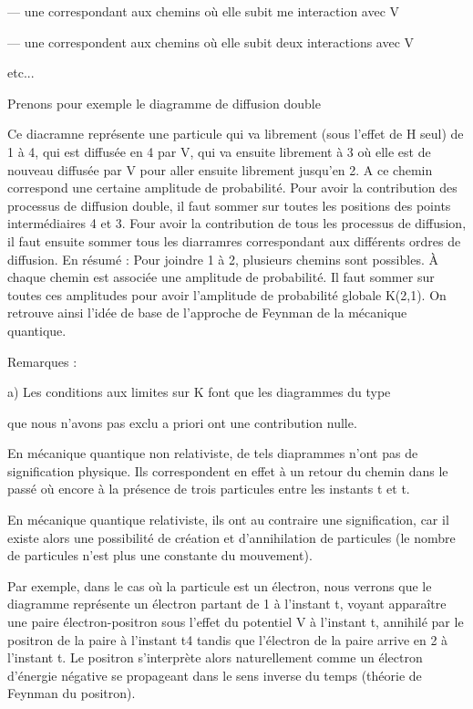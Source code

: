 — une correspondant aux chemins où elle subit me interaction avec V

— une correspondent aux chemins où elle subit deux interactions avec V

etc...

Prenons pour exemple le diagramme de diffusion double

Ce diacramne représente une particule qui va librement (sous l'effet de
H seul) de 1 à 4, qui est diffusée en 4 par V, qui va ensuite librement
à 3 où elle est de nouveau diffusée par V pour aller ensuite librement
jusqu'en 2. A ce chemin correspond une certaine amplitude de probabilité.
Pour avoir la contribution des processus de diffusion double, il faut
sommer sur toutes les positions des points intermédiaires 4 et 3. Four
avoir la contribution de tous les processus de diffusion, il faut ensuite
sommer tous les diarramres correspondant aux différents ordres de diffusion.
En résumé : Pour joindre 1 à 2, plusieurs chemins sont possibles. À chaque
chemin est associée une amplitude de probabilité. Il faut sommer sur toutes
ces amplitudes pour avoir l'amplitude de probabilité globale K(2,1).
On retrouve ainsi l'idée de base de l'approche de Feynman de la mécanique
quantique.

Remarques :

a) Les conditions aux limites sur K font que les diagrammes du type

que nous n'avons pas exclu a priori ont une contribution nulle.

En mécanique quantique non relativiste, de tels diaprammes n'ont
pas de signification physique. Ils correspondent en effet à un retour du
chemin dans le passé où encore à la présence de trois particules entre les
instants t et t.

En mécanique quantique relativiste, ils ont au contraire une
signification, car il existe alors une possibilité de création et d'annihilation
de particules (le nombre de particules n'est plus une constante
du mouvement).

Par exemple, dans le cas où la particule est un électron, nous
verrons que le diagramme représente un électron partant de 1 à l'instant t,
voyant apparaître une paire électron-positron sous l'effet du potentiel V
à l'instant t, annihilé par le positron de la paire à l'instant t4 tandis
que l'électron de la paire arrive en 2 à l'instant t. Le positron s'interprète
alors naturellement comme un électron d'énergie négative se propageant
dans le sens inverse du temps (théorie de Feynman du positron).

